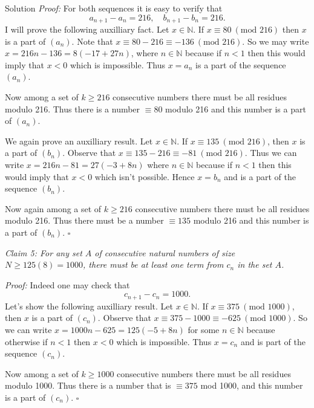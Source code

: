 \documentclass{article}
\begin{document}
\begin{solution}{Solution}
\textit{Proof:} For both sequences it is easy to verify that
$$
a_{n+1} - a_n = 216, \quad b_{n+1} - b_n = 216.
$$
I will prove the following auxilliary fact. Let $x \in \mathbb{N}$.
If $x \equiv 80 \ (\text{mod } 216)$ then $x$ is a part of $(a_n)$.
Note that $x \equiv 80 - 216 \equiv -136 \ (\text{mod } 216)$. So we may
write $x = 216n - 136 = 8(-17 + 27n)$, where $n \in \mathbb{N}$ because
if $n < 1$ then this would imply that $x < 0$ which is impossible. Thus
$x  = a_n$ is a part of the sequence $(a_n)$. \vspace{0.2cm}

Now among a set of $k \geq 216$ consecutive numbers there must be all
residues modulo 216. Thus there is a number $\equiv 80$ modulo 216
and this number is a part of $(a_n)$. \vspace{0.2cm}

We again prove an auxilliary result. Let $x \in \mathbb{N}$. If
$x \equiv 135 \ (\text{mod } 216)$, then $x$ is a part of $(b_n)$. Observe
that $x \equiv 135 - 216 \equiv -81 \ (\text{mod } 216)$. Thus we can write
$x = 216n - 81 = 27(-3 + 8n)$ where $n \in \mathbb{N}$ because if $n < 1$
then this would imply that $x < 0$ which isn't possible. Hence
$x = b_n$ and is a part of the sequence $(b_n)$. \vspace{-0.2cm}

Now again among a set of $k \geq 216$ consecutive numbers there must be
all residues modulo 216. Thus there must be a number $\equiv 135$
modulo 216 and this number is a part of $(b_n)$.
$\square$ \\ \bigskip

\textit{Claim 5: For any set $A$ of consecutive natural numbers of size
$N \geq 125(8) = 1000$, there must be at least one term from $c_n$ in the
set $A$.}
\vspace{0.2cm}

\textit{Proof:} Indeed one may check that
$$
c_{n+1} - c_n = 1000.
$$
Let's show the following auxilliary result. Let $x \in \mathbb{N}$. If
$x \equiv 375 \ (\text{mod } 1000)$, then $x$ is a part of $(c_n)$. Observe
that $x \equiv 375 - 1000 \equiv -625 \ (\text{mod } 1000)$. So we can write
$x = 1000n - 625 = 125(-5 + 8n)$ for some $n \in \mathbb{N}$ because
otherwise if $n < 1$ then $x < 0$ which is impossible. Thus $x = c_n$ and
is part of the sequence $(c_n)$.
\vspace{0.2cm}

Now among a set of $k \geq 1000$ consecutive numbers there must be all
residues modulo 1000. Thus there is a number that is $\equiv 375$ mod 1000,
and this number is a part of $(c_n)$. $\square$ \\
\bigskip


\end{solution}
\end{document}

